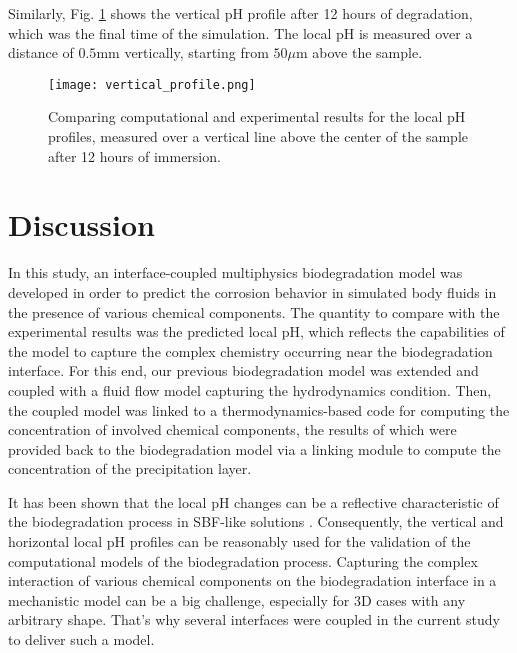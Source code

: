 Similarly, Fig. \ref{fig:kinetics_vertical_profile} shows the vertical pH profile after 12 hours of degradation, which was the final time of the simulation. The local pH is measured over a distance of $0.5 \mathrm{mm}$ vertically, starting from $50 \mu\mathrm{m}$ above the sample.

\begin{figure}[h]
\centering
\medskip
\texttt{[image: vertical\_profile.png]}
\caption[Comparing computational and experimental vertical pH profiles]{Comparing computational and experimental results for the local pH profiles, measured over a vertical line above the center of the sample after 12 hours of immersion.} \label{fig:kinetics_vertical_profile}
\end{figure}

\section{Discussion}

In this study, an interface-coupled multiphysics biodegradation model was developed in order to predict the corrosion behavior in simulated body fluids in the presence of various chemical components. The quantity to compare with the experimental results was the predicted local pH, which reflects the capabilities of the model to capture the complex chemistry occurring near the biodegradation interface. For this end, our previous biodegradation model \cite{Barzegari2021} was extended and coupled with a fluid flow model capturing the hydrodynamics condition. Then, the coupled model was linked to a thermodynamics-based code for computing the concentration of involved chemical components, the results of which were provided back to the biodegradation model via a linking module to compute the concentration of the precipitation layer.

It has been shown that the local pH changes can be a reflective characteristic of the biodegradation process in \gls{SBF}-like solutions \cite{Gonzalez2021,Wang2022}. Consequently, the vertical and horizontal local pH profiles can be reasonably used for the validation of the computational models of the biodegradation process. Capturing the complex interaction of various chemical components on the biodegradation interface in a mechanistic model can be a big challenge, especially for 3D cases with any arbitrary shape. That's why several interfaces were coupled in the current study to deliver such a model.

